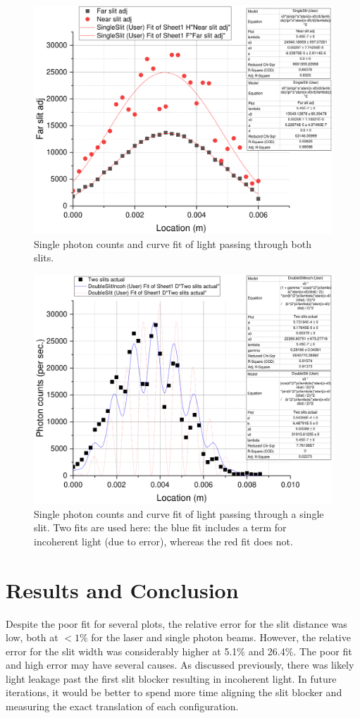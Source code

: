 \documentclass[notitlepage]{report}
\begin{document}
		
	\begin{figure}[p]
		\centering
		\includegraphics[width=0.7\linewidth]{Graph9}
		\caption{Single photon counts and curve fit of light passing through both slits.}
		\label{fig:graph9}
	\end{figure}
	\begin{figure}[p]
		\centering
		\includegraphics[width=0.7\linewidth]{Graph8}
		\caption{Single photon counts and curve fit of light passing through a single slit. Two fits are used here: the blue fit includes a term for incoherent light (due to error), whereas the red fit does not.}
		\label{fig:graph8}
	\end{figure}

	
	\section{Results and Conclusion}
	Despite the poor fit for several plots, the relative error for the slit distance was low, both at $<1\%$ for the laser and single photon beams. However, the relative error for the slit width was considerably higher at 5.1\% and 26.4\%. The poor fit and high error may have several causes. As discussed previously, there was likely light leakage past the first slit blocker resulting in incoherent light. In future iterations, it would be better to spend more time aligning the slit blocker and measuring the exact translation of each configuration.
	
\end{document}
